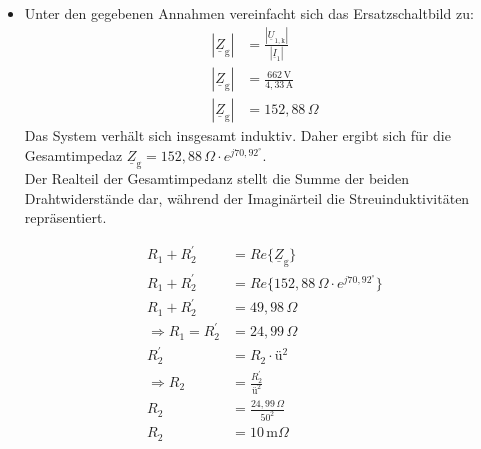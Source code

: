 {\begin{itemize}
		\item[d)]
			Unter den gegebenen Annahmen vereinfacht sich das Ersatzschaltbild zu:
			\begin{align*}
				|\underline{Z}_\mathrm{g}| &= \frac{|\underline{U}_{1,\mathrm{k}}|}{|\underline{I}_1|}\\
				|\underline{Z}_\mathrm{g}| &= \frac{662\,\mathrm{V}}{4,33\,\mathrm{A}}\\
				|\underline{Z}_\mathrm{g}| &= 152,88\,\Omega
			\end{align*}
			Das System verhält sich insgesamt induktiv. Daher ergibt sich für die Gesamtimpedaz $\underline{Z}_\mathrm{g} = 152,88\,\Omega \cdot e^{j70,92^\circ}$.\\
			Der Realteil der Gesamtimpedanz stellt die Summe der beiden Drahtwiderstände dar, während der Imaginärteil die Streuinduktivitäten repräsentiert.\\
			\noindent
			\begin{minipage}[t]{0.49\linewidth}
				\begin{align*}
					R_1 + R_2^\prime &= Re\{ \underline{Z}_\mathrm{g} \}\\
					R_1 + R_2^\prime &= Re\{ 152,88\,\Omega \cdot e^{j70,92^\circ} \}\\
					R_1 + R_2^\prime &= 49,98\,\Omega\\
					\Rightarrow R_1 = R_2^\prime &= 24,99\,\Omega\\
					R_2^\prime &= R_2 \cdot \textit{ü}^2\\
					\Rightarrow R_2 &= \frac{R_2^\prime}{\textit{ü}^2}\\
					R_2 &= \frac{24,99\,\Omega}{50^2}\\
					R_2 &= 10\,\mathrm{m}\Omega
				\end{align*}
			\end{minipage}
			\hfil
			\begin{minipage}[t]{0.49\linewidth}
				\begin{align*}

\end{align*}
\end{minipage}
\end{itemize}}
